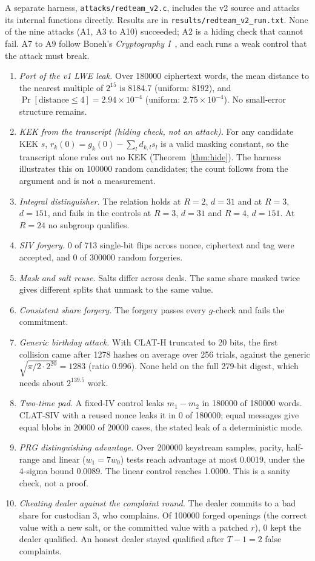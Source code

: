 \documentclass[10pt,a4paper]{article}
\newcommand{\code}[1]{\texttt{#1}}
\theoremstyle{definition}
\theoremstyle{remark}
\begin{document}
A separate harness, \code{attacks/redteam\_v2.c}, includes the v2 source and attacks its internal functions directly. Results are in \code{results/redteam\_v2\_run.txt}. None of the nine attacks (A1, A3 to A10) succeeded; A2 is a hiding check that cannot fail. A7 to A9 follow Boneh's \emph{Cryptography I}~\cite{boneh}, and each runs a weak control that the attack must break.
\begin{enumerate}[label=A\arabic*]
  \item \emph{Port of the v1 LWE leak.} Over 180000 ciphertext words, the mean distance to the nearest multiple of $2^{15}$ is 8184.7 (uniform: 8192), and $\Pr[\text{distance} \le 4] = 2.94\times10^{-4}$ (uniform: $2.75\times10^{-4}$). No small-error structure remains.
  \item \emph{KEK from the transcript (hiding check, not an attack).} For any candidate KEK $s$, $r_k(0) = g_k(0) - \sum_l d_{k,l} s_l$ is a valid masking constant, so the transcript alone rules out no KEK (Theorem~\ref{thm:hide}). The harness illustrates this on 100000 random candidates; the count follows from the argument and is not a measurement.
  \item \emph{Integral distinguisher.} The relation holds at $R=2$, $d=31$ and at $R=3$, $d=151$, and fails in the controls at $R=3$, $d=31$ and $R=4$, $d=151$. At $R = 24$ no subgroup qualifies.
  \item \emph{SIV forgery.} 0 of 713 single-bit flips across nonce, ciphertext and tag were accepted, and 0 of 300000 random forgeries.
  \item \emph{Mask and salt reuse.} Salts differ across deals. The same share masked twice gives different splits that unmask to the same value.
  \item \emph{Consistent share forgery.} The forgery passes every $g$-check and fails the commitment.
  \item \emph{Generic birthday attack.} With CLAT-H truncated to 20 bits, the first collision came after 1278 hashes on average over 256 trials, against the generic $\sqrt{\pi/2 \cdot 2^{20}} = 1283$ (ratio 0.996). None held on the full 279-bit digest, which needs about $2^{139.5}$ work.
  \item \emph{Two-time pad.} A fixed-IV control leaks $m_1 - m_2$ in 180000 of 180000 words. CLAT-SIV with a reused nonce leaks it in 0 of 180000; equal messages give equal blobs in 20000 of 20000 cases, the stated leak of a deterministic mode.
  \item \emph{PRG distinguishing advantage.} Over 200000 keystream samples, parity, half-range and linear ($w_1 = 7 w_0$) tests reach advantage at most 0.0019, under the 4-sigma bound 0.0089. The linear control reaches 1.0000. This is a sanity check, not a proof.
  \item \emph{Cheating dealer against the complaint round.} The dealer commits to a bad share for custodian 3, who complains. Of 100000 forged openings (the correct value with a new salt, or the committed value with a patched $r$), 0 kept the dealer qualified. An honest dealer stayed qualified after $T-1 = 2$ false complaints.
\end{enumerate}
\end{document}

